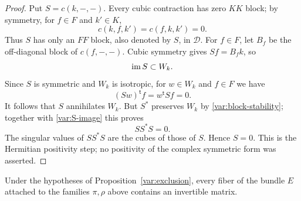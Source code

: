 \begin{proof}
Put $S=c(k,-,-)$.  Every cubic contraction has zero $KK$ block;
by symmetry, for $f\in F$ and $k'\in K$,
\[
                 c(k,f,k')=c(f,k,k')=0.
\]
Thus $S$ has only an $FF$ block, also denoted by $S$, in
$\mathcal D$.  For $f\in F$, let $B_f$ be the off-diagonal block of
$c(f,-,-)$.  Cubic symmetry gives $Sf=B_fk$, so
\begin{equation}
                  \operatorname{im} S\subset W_k.
 \label{var:S-image}
\end{equation}
Since $S$ is symmetric and $W_k$ is isotropic, for $w\in W_k$ and
$f\in F$ we have
\[
                  (Sw)^{\mathsf t}f=w^{\mathsf t}Sf=0.
\]
It follows that $S$ annihilates $W_k$.  But $S^*$ preserves $W_k$
by \eqref{var:block-stability}; together with
\eqref{var:S-image} this proves
\begin{equation}
                           SS^*S=0.
 \label{var:positive-triple-zero}
\end{equation}
The singular values of $SS^*S$ are the cubes of those of $S$.
Hence $S=0$.  This is the Hermitian positivity step; no positivity
of the complex symmetric form was asserted.
\end{proof}

\begin{lemma}
\label{var:invertible}
Under the hypotheses of Proposition~\ref{var:exclusion}, every fiber
of the bundle $E$ attached to the families $\pi,\rho$ above contains
an invertible matrix.
\end{lemma}

